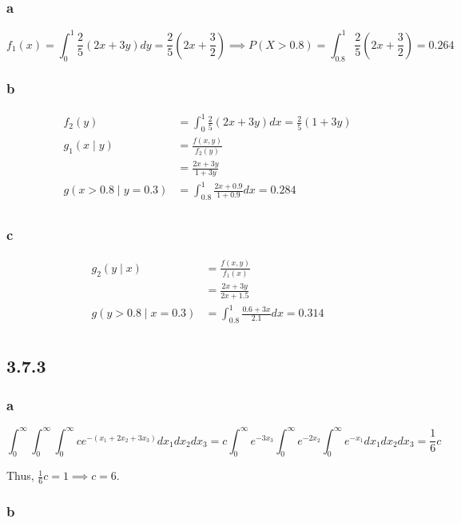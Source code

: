 \documentclass[12pt,letterpaper]{article}
\theoremstyle{definition}
\begin{document}
\subsubsection*{a}

\[
  f_1(x) = \int_0^1\frac{2}{5}(2x+3y)dy = \frac{2}{5}(2x + \frac{3}{2}) \implies
  P(X > 0.8) = \int_{0.8}^1 \frac{2}{5}(2x + \frac{3}{2}) = 0.264
\]

\subsubsection*{b}

\begin{align*}
  f_2(y) &= \int_0^1\frac{2}{5}(2x + 3y)dx = \frac{2}{5}(1 + 3y) \\
  g_1(x \mid y) &= \frac{f(x,y)}{f_2(y)} \\
                &= \frac{2x + 3y}{1 + 3y} \\
  g(x > 0.8 \mid y = 0.3) &= \int_{0.8}^1\frac{2x + 0.9}{1 + 0.9}dx =0.284 \\
\end{align*}

\subsubsection*{c}

\begin{align*}
  g_2(y \mid x) &= \frac{f(x,y)}{f_1(x)} \\
         &= \frac{2x + 3y}{2x + 1.5} \\
  g(y > 0.8 \mid x = 0.3) &= \int_{0.8}^1\frac{0.6 + 3x}{2.1}dx = 0.314 \\
\end{align*}

\subsection*{3.7.3}

\subsubsection*{a}

\[
  \int_0^\infty\int_0^\infty\int_0^\infty ce^{-(x_1+2x_2+3x_3)}dx_1dx_2dx_3 = 
  c\int_0^\infty e^{-3x_3}\int_0^\infty e^{-2x_2}\int_0^\infty e^{-x_1}dx_1dx_2dx_3 = \frac{1}{6}c
\]

Thus, $\frac{1}{6}c = 1 \implies c = 6$.

\subsubsection*{b}
\end{document}
